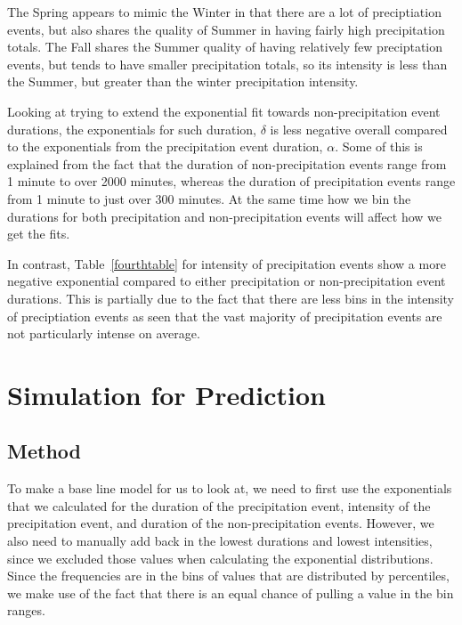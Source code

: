 \documentclass[11pt]{report}
\begin{document}
The Spring appears to mimic the Winter in that there are a lot of
preciptiation events, but also shares the quality of Summer in having
fairly high precipitation totals. The Fall shares the Summer quality
of having relatively few preciptation events, but tends to have
smaller precipitation totals, so its intensity is less than the
Summer, but greater than the winter precipitation intensity.
 

Looking at trying to extend the exponential fit towards non-precipitation
event durations, the exponentials for such duration, $\delta$ is less
negative overall compared to the exponentials from the precipitation event
duration, $\alpha$. Some of this is explained from the fact that the
duration of non-precipitation events range from 1 minute to over 2000
minutes, whereas the duration of precipitation events range from 1 minute to
just over 300 minutes. At the same time how we bin the durations for both
precipitation and non-precipitation events will affect how we get the fits.






In contrast, Table~\ref{fourthtable} for intensity of precipitation events
show a more negative exponential compared to either precipitation or
non-precipitation event durations. This is partially due to the fact that
there are less bins in the intensity of preciptiation events as seen that
the vast majority of precipitation events are not particularly intense on
average.

\clearpage

\section{Simulation for Prediction}\label{sec:sfp}

\subsection{Method}\label{sec:sfp_m}
To make a base line model for us to look at, we need to first use the exponentials that we calculated for the duration of the precipitation event, intensity of the precipitation event, and duration of the non-precipitation events. However, we also need to manually add back in the lowest durations and lowest intensities, since we excluded those values when calculating the exponential distributions. Since the frequencies are in the bins of values that are distributed by percentiles, we make use of the fact that there is an equal chance of pulling a value in the bin ranges. 
\end{document}
